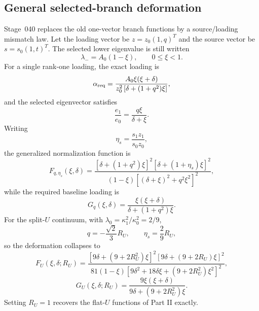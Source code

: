 \subsection{General selected-branch deformation}
\label{subsec:part03-general-selected-deformation}

Stage~040 replaces the old one-vector branch functions by a source/loading mismatch law.  Let the loading vector be \(z=z_0(1,q)^T\) and the source vector be \(s=s_0(1,t)^T\).  The selected lower eigenvalue is still written
\begin{equation}
\label{eq:part03-lambda-xi}
\lambda_-=A_0(1-\xi),
\qquad
0\leq\xi<1.
\end{equation}
For a single rank-one loading, the exact loading is
\begin{equation}
\label{eq:part03-alpha-req-q}
\alpha_{\rm req}=\frac{A_0\xi(\xi+\delta)}{z_0^2\left[\delta+(1+q^2)\xi\right]},
\end{equation}
and the selected eigenvector satisfies
\begin{equation}
\label{eq:part03-eigenvector-single}
\frac{e_1}{e_0}=\frac{q\xi}{\delta+\xi}.
\end{equation}
Writing
\begin{equation}
\eta_s=\frac{s_1z_1}{s_0z_0},
\end{equation}
the generalized normalization function is
\begin{equation}
\label{eq:part03-F-qeta}
\boxed{
F_{q,\eta_s}(\xi,\delta)
=\frac{\left[\delta+(1+q^2)\xi\right]^2
       \left[\delta+(1+\eta_s)\xi\right]^2}
{(1-\xi)\left[(\delta+\xi)^2+q^2\xi^2\right]^2}},
\end{equation}
while the required baseline loading is
\begin{equation}
\label{eq:part03-G-q}
\boxed{
G_q(\xi,\delta)=\frac{\xi(\xi+\delta)}{\delta+(1+q^2)\xi}}.
\end{equation}
For the split-\(U\) continuum, with \(\lambda_0=\kappa_1^2/\kappa_0^2=2/9\),
\begin{equation}
\label{eq:part03-q-eta-RU}
q=-\frac{\sqrt2}{3}R_U,
\qquad
\eta_s=\frac{2}{9}R_U,
\end{equation}
so the deformation collapses to
\begin{equation}
\label{eq:part03-FU}
\boxed{
F_U(\xi,\delta;R_U)=
\frac{\left[9\delta+(9+2R_U^2)\xi\right]^2
      \left[9\delta+(9+2R_U)\xi\right]^2}
{81(1-\xi)\left[9\delta^2+18\delta\xi+(9+2R_U^2)\xi^2\right]^2}},
\end{equation}
\begin{equation}
\label{eq:part03-GU}
\boxed{
G_U(\xi,\delta;R_U)=
\frac{9\xi(\xi+\delta)}{9\delta+(9+2R_U^2)\xi}}.
\end{equation}
Setting \(R_U=1\) recovers the flat-\(U\) functions of Part II exactly.

